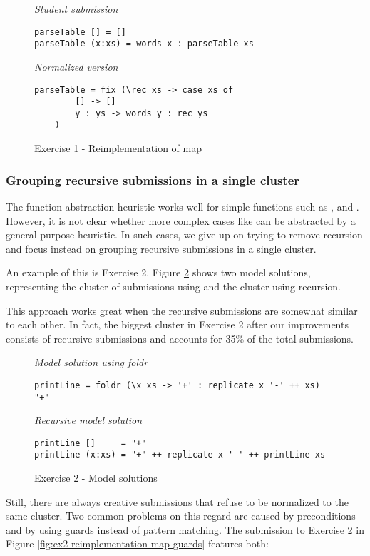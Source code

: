 \begin{figure}
\centering
\emph{Student submission}
\begin{verbatim}
parseTable [] = []
parseTable (x:xs) = words x : parseTable xs
\end{verbatim}
\bigskip
\emph{Normalized version}
\begin{verbatim}
parseTable = fix (\rec xs -> case xs of
        [] -> []
        y : ys -> words y : rec ys
    )
\end{verbatim}
\caption{Exercise 1 - Reimplementation of map}
\label{fig:ex1-reimplementation-map}
\end{figure}

\subsubsection{Grouping recursive submissions in a single cluster}

The function abstraction heuristic works well for simple functions such as ,  and . However, it is not clear whether more complex cases like  can be abstracted by a general-purpose heuristic. In such cases, we give up on trying to remove recursion and focus instead on grouping recursive submissions in a single cluster.

An example of this is Exercise 2. Figure \ref{fig:ex2-model-solutions} shows two model solutions, representing the cluster of submissions using  and the cluster using recursion.

This approach works great when the recursive submissions are somewhat similar to each other. In fact, the biggest cluster in Exercise 2 after our improvements consists of recursive submissions and accounts for 35\% of the total submissions.

\begin{figure}
\centering
\emph{Model solution using foldr}
\begin{verbatim}
printLine = foldr (\x xs -> '+' : replicate x '-' ++ xs) "+"
\end{verbatim}
\bigskip
\emph{Recursive model solution}
\begin{verbatim}
printLine []     = "+"
printLine (x:xs) = "+" ++ replicate x '-' ++ printLine xs
\end{verbatim}
\caption{Exercise 2 - Model solutions}
\label{fig:ex2-model-solutions}
\end{figure}

Still, there are always creative submissions that refuse to be normalized to the same cluster. Two common problems on this regard are caused by preconditions and by using guards instead of pattern matching. The submission to Exercise 2 in Figure \ref{fig:ex2-reimplementation-map-guards} features both:

